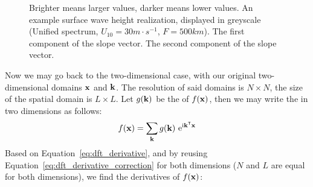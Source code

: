 \begin{figure}
{ }
 \hfill
\caption[A wave height realization with its corresponding slopes.]{
Brighter means larger values, darker means lower values.
 An example
surface wave height realization, displayed in greyscale (Unified spectrum, 
$U_{10}=30m\cdot s^{-1}$, $F=500km$).  The 
first component of the slope vector.  The 
second component of the slope vector.
}
\label{fig:derivatives}
\end{figure}
%
Now we may go back to the two-dimensional case, with our original two-dimensional
domains $\mathbf{x}$ and $\mathbf{k}$. The resolution of said domains is $N \times N$,
the size of the spatial domain is $L \times L$. Let $g(\mathbf{k})$ be the
\DiscreteFourierTransform of $f(\mathbf{x})$, then we may write the
\InvDiscreteFourierTransform in two dimensions as follows:
\begin{equation*}
 f(\mathbf{x}) = \sum_{\mathbf{k}}g(\mathbf{k})~\mathrm{e}^{\mathrm{i}\mathbf{k}^{\mathsf{T}}\mathbf{x}}
\end{equation*}
Based on Equation~\ref{eq:dft_derivative}, and by reusing Equation~\ref{eq:dft_derivative_correction}
for both dimensions ($N$ and $L$ are equal for both dimensions), we find the derivatives of $f(\mathbf{x})$:
